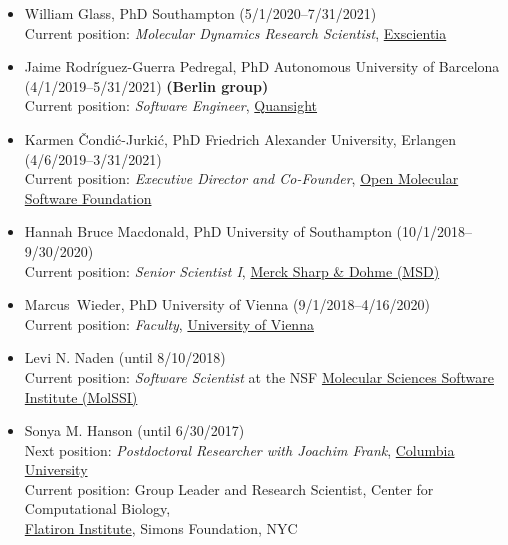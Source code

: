 \documentclass[10pt]{article}
\begin{document}
\begin{itemize}
  \item William Glass, PhD Southampton (5/1/2020--7/31/2021) \\
  Current position: \emph{Molecular Dynamics Research Scientist}, \href{https://www.exscientia.ai/}{Exscientia}

  \item Jaime Rodr\'{i}guez-Guerra Pedregal, PhD Autonomous University of Barcelona (4/1/2019--5/31/2021) {\bf (Berlin group)}\\
  Current position: \emph{Software Engineer}, \href{https://quansight.com/}{Quansight}

  \item Karmen \v{C}ondi\'{c}-Jurki\'{c}, PhD Friedrich Alexander University, Erlangen (4/6/2019--3/31/2021)\\
  Current position: \emph{Executive Director and Co-Founder}, \href{http://omsf.io}{Open Molecular Software Foundation}

  \item Hannah Bruce Macdonald, PhD University of Southampton (10/1/2018--9/30/2020)\\
  Current position: \emph{Senior Scientist I}, \href{http://www.merck.com}{Merck Sharp \& Dohme (MSD)}
  
  \item Marcus~Wieder, PhD University of Vienna (9/1/2018--4/16/2020)\\
  Current position: \emph{Faculty}, \href{https://www.univie.ac.at/en/}{University of Vienna}
  
  \item Levi N. Naden (until 8/10/2018)\\
  Current position: \emph{Software Scientist} at the NSF \href{http://molssi.org}{Molecular Sciences Software Institute (MolSSI)}
  
  \item Sonya M. Hanson (until 6/30/2017)\\
  Next position: \emph{Postdoctoral Researcher with Joachim Frank}, \href{http://franklab.cpmc.columbia.edu/franklab/}{{Columbia University}}\\
  Current position: Group Leader and Research Scientist, Center for Computational Biology, \\ \href{https://www.simonsfoundation.org/flatiron/}{Flatiron Institute}, Simons Foundation, NYC
 

\end{itemize}
\end{document}
